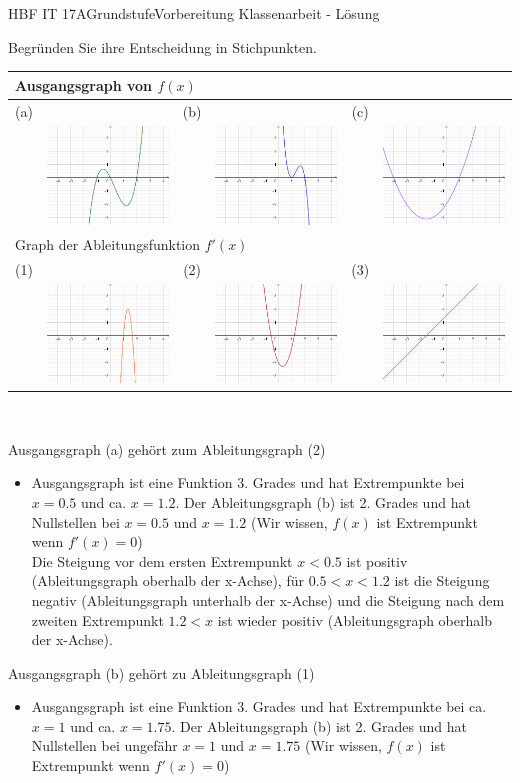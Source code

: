 \documentclass[oneside,openany,headings=optiontotoc,11pt,numbers=noenddot]{scrreprt}
\begin{document}
\begin{worksheet}{HBF IT 17A}{Grundstufe}{Vorbereitung Klassenarbeit - Lösung}
\begin{framed}
			Begründen Sie ihre Entscheidung in Stichpunkten.\\
			\begin{tabularx}{\textwidth}{|cX|cX|cX|}
				\hline
				\multicolumn{6}{|l|}{Ausgangsgraph von \(f(x)\)}\\
				\hline
				(a) & & (b) & & (c) &\\
				& \includegraphics[scale=0.2]{Bilder/fue.png} & & \includegraphics[scale=0.2]{Bilder/gue.png} & & \includegraphics[scale=0.2]{Bilder/hue.png}\\
				\hline
				\multicolumn{6}{|l|}{Graph der Ableitungsfunktion \(f'(x)\)}\\
				\hline
				(1) & & (2) & & (3) &\\
				& \includegraphics[scale=0.2]{Bilder/g'ue.png} & & \includegraphics[scale=0.2]{Bilder/f'ue.png} & & \includegraphics[scale=0.2]{Bilder/h'ue.png}\\
				\hline
			\end{tabularx}\\
			\par\bigskip\noindent
			Ausgangsgraph (a) gehört zum Ableitungsgraph (2)
			\begin{itemize}
				\item Ausgangsgraph ist eine Funktion 3. Grades und hat Extrempunkte bei \(x=0.5\) und ca. \(x=1.2\). Der Ableitungsgraph (b) ist 2. Grades und hat Nullstellen bei \(x=0.5\) und \(x=1.2\) (Wir wissen, \(f(x) \) ist Extrempunkt wenn \(f'(x)=0\))\\
				Die Steigung vor dem ersten Extrempunkt \(x<0.5\) ist positiv (Ableitungsgraph oberhalb der x-Achse), für \(0.5 < x < 1.2\) ist die Steigung negativ (Ableitungsgraph unterhalb der x-Achse) und die Steigung nach dem zweiten Extrempunkt \(1.2<x\) ist wieder positiv (Ableitungsgraph oberhalb der x-Achse).
			\end{itemize}
			Ausgangsgraph (b) gehört zu Ableitungsgraph (1)
			\begin{itemize}
 				\item Ausgangsgraph ist eine Funktion 3. Grades und hat Extrempunkte bei ca. \(x=1\) und ca. \(x=1.75\). Der Ableitungsgraph (b) ist 2. Grades und hat Nullstellen bei ungefähr \(x=1\) und \(x=1.75\) (Wir wissen, \(f(x) \) ist Extrempunkt wenn \(f'(x)=0\))\
\end{itemize}
\end{framed}
\end{worksheet}
\end{document}
